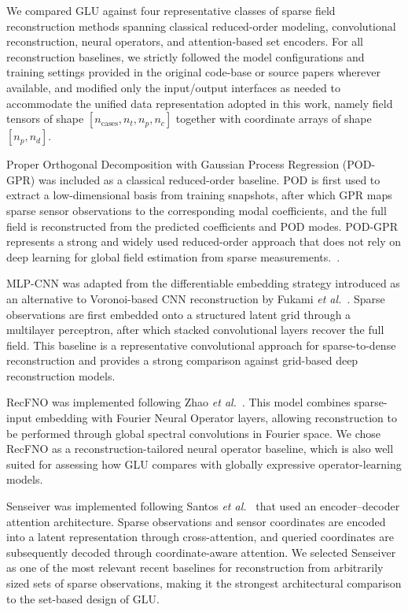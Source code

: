 \documentclass[pdflatex,sn-nature]{sn-jnl}%
\begin{document}
We compared GLU against four representative classes of sparse field reconstruction methods spanning classical reduced-order modeling, convolutional reconstruction, neural operators, and attention-based set encoders.
For all reconstruction baselines, we strictly followed the model configurations and training settings provided in the original code-base or source papers wherever available, and modified only the input/output interfaces as needed to accommodate the unified data representation adopted in this work, namely field tensors of shape $[n_{\mathrm{cases}}, n_t, n_p, n_c]$ together with coordinate arrays of shape $[n_p, n_d]$. 

Proper Orthogonal Decomposition with Gaussian Process Regression (POD-GPR) was included as a classical reduced-order baseline. 
POD is first used to extract a low-dimensional basis from training snapshots, after which GPR maps sparse sensor observations to the corresponding modal coefficients, and the full field is reconstructed from the predicted coefficients and POD modes. 
POD-GPR represents a strong and widely used reduced-order approach that does not rely on deep learning for global field estimation from sparse measurements.~\cite{procacci2023adaptive}.

MLP-CNN was adapted from the differentiable embedding strategy introduced as an alternative to Voronoi-based CNN reconstruction by Fukami \emph{et al.}~\cite{fukami2021global}. 
Sparse observations are first embedded onto a structured latent grid through a multilayer perceptron, after which stacked convolutional layers recover the full field. 
This baseline is a representative convolutional approach for sparse-to-dense reconstruction and provides a strong comparison against grid-based deep reconstruction models.

RecFNO was implemented following Zhao \emph{et al.}~\cite{zhao2024recfno}. 
This model combines sparse-input embedding with Fourier Neural Operator layers, allowing reconstruction to be performed through global spectral convolutions in Fourier space. 
We chose RecFNO as a reconstruction-tailored neural operator baseline, which is also well suited for assessing how GLU compares with globally expressive operator-learning models.

Senseiver was implemented following Santos \emph{et al.}~\cite{santos2023development} that used an encoder--decoder attention architecture. 
Sparse observations and sensor coordinates are encoded into a latent representation through cross-attention, and queried coordinates are subsequently decoded through coordinate-aware attention. 
We selected Senseiver as one of the most relevant recent baselines for reconstruction from arbitrarily sized sets of sparse observations, making it the strongest architectural comparison to the set-based design of GLU.
\end{document}
